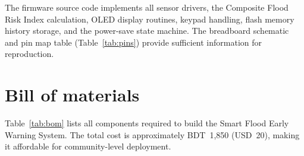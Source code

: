 \documentclass[5p,twocolumn]{elsarticle}
\begin{document}
\begin{table}[htbp]
  \caption{Design files summary.}
  \label{tab:design_files}
  \centering
  \scriptsize
\end{table}

The firmware source code implements all sensor drivers, the Composite Flood Risk Index calculation, OLED display routines, keypad handling, flash memory history storage, and the power-save state machine. The breadboard schematic and pin map table (Table~\ref{tab:pins}) provide sufficient information for reproduction.

\section{Bill of materials}

Table~\ref{tab:bom} lists all components required to build the Smart Flood Early Warning System. The total cost is approximately BDT~1,850 (USD~20), making it affordable for community-level deployment.
\end{document}
